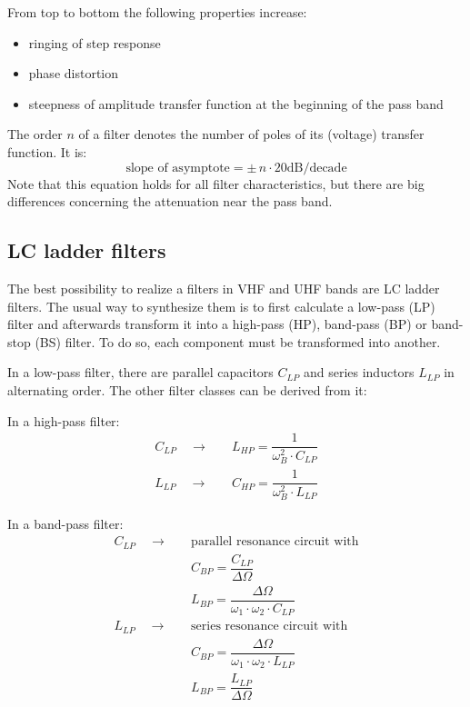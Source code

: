 \addvspace{12pt}

From top to bottom the following properties increase:
\begin{itemize}
\item ringing of step response
\item phase distortion
\item steepness of amplitude transfer function at the beginning of the pass band
\end{itemize}

\addvspace{12pt}

The order $n$ of a filter denotes the number of poles of its (voltage)
transfer function. It is:
\begin{equation}
\text{slope of asymptote} = \pm\, n\cdot 20 \text{dB/decade}
\end{equation}
Note that this equation holds for all filter characteristics, but
there are big differences concerning the attenuation near the pass
band.


\subsection{LC ladder filters}

The best possibility to realize a filters in VHF and UHF bands are
LC ladder filters. The usual way to synthesize them is to first
calculate a low-pass (LP) filter and afterwards transform it into a
high-pass (HP), band-pass (BP) or band-stop (BS) filter. To do so,
each component must be transformed into another.

\addvspace{12pt}

In a low-pass filter, there are  parallel capacitors $C_{LP}$ and
series inductors $L_{LP}$ in alternating order. The other filter
classes can be derived from it:

\addvspace{12pt}

In a high-pass filter:
\begin{align}
C_{LP} \quad \rightarrow \quad & L_{HP} = \dfrac{1}{\omega_B^2\cdot C_{LP}} \\
L_{LP} \quad \rightarrow \quad & C_{HP} = \dfrac{1}{\omega_B^2\cdot L_{LP}}
\end{align}

\addvspace{12pt}

In a band-pass filter:
\begin{align}
C_{LP} \quad \rightarrow \quad & \text{parallel resonance circuit with} \\
                               & C_{BP} = \dfrac{C_{LP}}{\Delta\Omega} \\
                               & L_{BP} = \dfrac{\Delta\Omega}{\omega_1\cdot \omega_2\cdot C_{LP}} \\
L_{LP} \quad \rightarrow \quad & \text{series resonance circuit with} \\
                               & C_{BP} = \dfrac{\Delta\Omega}{\omega_1\cdot \omega_2\cdot L_{LP}} \\
                               & L_{BP} = \dfrac{L_{LP}}{\Delta\Omega}
\end{align}

